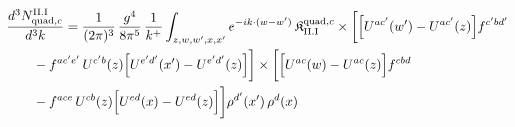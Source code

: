 \begingroup\small
\begin{align}\label{eq:H-II.I-2c}
&\frac{d^{3}N^{\rm II.I}_{{\rm quad},c}}{d^{3}k}=\frac{1}{(2\pi)^{3}}\, \frac{g^{4}}{8\pi^{5}}\, \frac{1}{k^{+}} \int_{z,w,w',x,x'}e^{-ik\cdot(w-w')}\, \mathfrak{K}^{{\rm quad},c}_{\rm II.I} \times\bigg[\Big[U^{ac'}(w')-U^{ac'}(z)\Big]f^{c'bd'}\notag\\
&\quad\quad -f^{ac'e'}\, U^{c'b}(z)\Big[U^{e'd'}(x')-U^{e'd'}(z)\Big]\bigg] \times\bigg[\Big[U^{ac}(w)-U^{ac}(z)\Big]f^{cbd}\notag\\
&\quad\quad -f^{ace}\, U^{cb}(z)\Big[U^{ed}(x)-U^{ed}(z)\Big]\bigg]\rho^{d'}(x')\, \rho^{d}(x)
\end{align}
\endgroup
